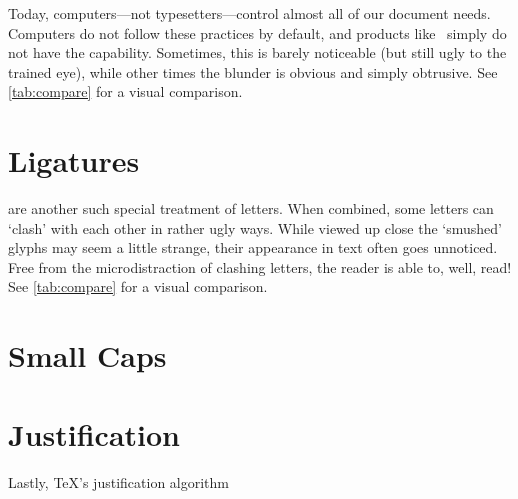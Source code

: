 \documentclass[draft]{article}
\begin{document}
Today, computers---not typesetters---control almost all of our document needs.
Computers do not follow these practices by default,
  and products like \MicrosoftWord\ simply do not have the capability.
Sometimes, this is barely noticeable (but still ugly to the trained eye),
  while other times the blunder is obvious and simply obtrusive.
See \autoref{tab:compare} for a visual comparison.



\section{Ligatures}
\label{sec:ligatures}

 are another such special treatment of letters.
When combined, some letters can `clash' with each other in rather ugly ways.
While viewed up close the `smushed' glyphs may seem a little strange,
  their appearance in text often goes unnoticed.
Free from the microdistraction of clashing letters,
  the reader is able to, well, read!
See \autoref{tab:compare} for a visual comparison.

\section{Small Caps}
\label{sec:small-caps}

\section{Justification}
\label{sec:justification}

Lastly, \TeX's justification algorithm 

\appendix
\end{document}
